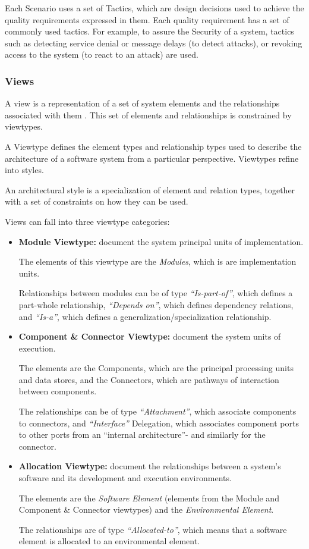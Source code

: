 \documentclass{llncs}
\begin{document}
Each Scenario uses a set of Tactics, which are design decisions used to achieve the quality requirements expressed in them. Each quality requirement has a set of commonly used tactics. For example, to assure the Security of a system, tactics such as detecting service denial or message delays (to detect attacks), or revoking access to the system (to react to an attack) are used.

\subsubsection{Views}
\label{subsection:domainModelViews}
A view is a representation of a set of system elements and the relationships associated with them \cite{clements2003documenting}. This set of elements and relationships is constrained by viewtypes.

A Viewtype defines the element types and relationship types used to describe the architecture of a software system from a particular perspective. Viewtypes refine into styles.

An architectural style is a specialization of element and relation types, together with a set of constraints on how they can be used.

Views can fall into three viewtype categories:
\begin{itemize}
\item \textbf{Module Viewtype:} document the system principal units of implementation. 

The elements of this viewtype are the \textit{Modules}, which is are implementation units. 

Relationships between modules can be of type \textit{``Is-part-of''}, which defines a part-whole relationship, \textit{``Depends on''}, which defines dependency relations, and \textit{``Is-a''}, which defines a generalization/specialization relationship.

\item \textbf{Component \& Connector Viewtype:} document the system units of execution. 

The elements are the Components, which are the principal processing units and data stores, and the Connectors, which are pathways of interaction between components. 

The relationships can be of type \textit{``Attachment''}, which associate components to connectors, and \textit{``Interface''} Delegation, which associates component ports to other ports from an ``internal architecture''- and similarly for the connector.

\item \textbf{Allocation Viewtype:} document the relationships between a system's software and its development and execution environments. 

The elements are the \textit{Software Element} (elements from the Module and Component \& Connector viewtypes) and the \textit{Environmental Element}. 

The relationships are of type \textit{``Allocated-to''}, which means that a software element is allocated to an environmental element. 
\end{itemize}
\end{document}
